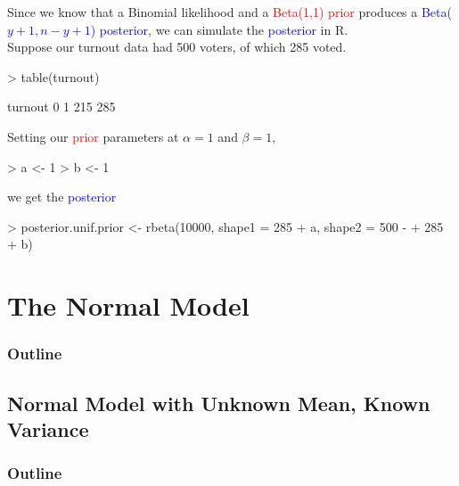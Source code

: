 \documentclass[handout]{beamer}
\begin{document}
\begin{frame}[fragile]
Since we know that a Binomial likelihood and a
\textcolor{red}{Beta(1,1) prior} produces a \textcolor{blue}{Beta($y+1,
n-y+1$) posterior}, we can simulate the \textcolor{blue}{posterior} in R.\\
\pause
\bigskip
Suppose our turnout data had 500 voters, of which 285 voted.
\pause
\medskip
\tiny{

\begin{Schunk}
\begin{Sinput}
> table(turnout)
\end{Sinput}
\begin{Soutput}
turnout
  0   1 
215 285 
\end{Soutput}
\end{Schunk}
} 
\pause
\bigskip
\normalsize{
Setting our \textcolor{red}{prior} parameters at $\alpha = 1$ and $\beta = 1$,
}
\medskip
\pause
\tiny{
\begin{Schunk}
\begin{Sinput}
> a <- 1
> b <- 1
\end{Sinput}
\end{Schunk}
} 
\pause
\bigskip
\normalsize{
we get the \textcolor{blue}{posterior}
}
\medskip
\pause
\tiny{
\begin{Schunk}
\begin{Sinput}
> posterior.unif.prior <- rbeta(10000, shape1 = 285 + a, shape2 = 500 - 
+     285 + b)
\end{Sinput}
\end{Schunk}
}
\normalsize
\end{frame}

\section{The Normal Model}

\begin{frame}
\frametitle{Outline}
\tableofcontents[currentsection]
\end{frame}

\subsection{Normal Model with Unknown Mean, Known Variance}

\begin{frame}
\frametitle{Outline}
\tableofcontents[currentsubsection]
\end{frame}
\end{document}
